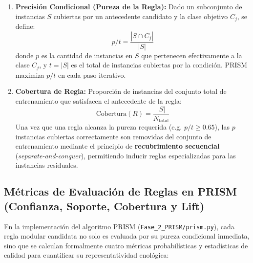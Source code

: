 \documentclass{article}
\begin{document}
\begin{enumerate}
    \item \textbf{Precisión Condicional (Pureza de la Regla):} Dado un subconjunto de instancias $S$ cubiertas por un antecedente candidato y la clase objetivo $C_j$, se define:
    \begin{equation}
        p/t = \frac{|S \cap C_j|}{|S|}
    \end{equation}
    donde $p$ es la cantidad de instancias en $S$ que pertenecen efectivamente a la clase $C_j$, y $t = |S|$ es el total de instancias cubiertas por la condición. PRISM maximiza $p/t$ en cada paso iterativo.
    \item \textbf{Cobertura de Regla:} Proporción de instancias del conjunto total de entrenamiento que satisfacen el antecedente de la regla:
    \begin{equation}
        \text{Cobertura}(R) = \frac{|S|}{N_{\text{total}}}
    \end{equation}
    Una vez que una regla alcanza la pureza requerida (e.g. $p/t \ge 0.65$), las $p$ instancias cubiertas correctamente son removidas del conjunto de entrenamiento mediante el principio de \textbf{recubrimiento secuencial} (\textit{separate-and-conquer}), permitiendo inducir reglas especializadas para las instancias residuales.
\end{enumerate}

\subsection{Métricas de Evaluación de Reglas en PRISM (Confianza, Soporte, Cobertura y Lift)}

En la implementación del algoritmo PRISM (\texttt{Fase\_2\_PRISM/prism.py}), cada regla modular candidata no solo es evaluada por su pureza condicional inmediata, sino que se calculan formalmente cuatro métricas probabilísticas y estadísticas de calidad para cuantificar su representatividad enológica:
\end{document}
